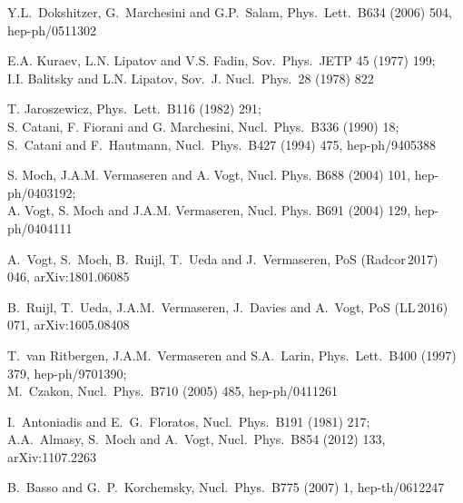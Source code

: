 \documentclass[12pt]{article}
\begin{document}
{\begin{thebibliography}{100}
Y.L.~Dokshitzer, G.~Marchesini and G.P.~Salam,
  Phys.\ Lett.\ B634 (2006) 504, hep-ph/0511302

E.A. Kuraev, L.N. Lipatov and V.S. Fadin,
  Sov.\ Phys.\ JETP 45 (1977) 199; \\[0.2mm]
I.I. Balitsky and L.N. Lipatov,
  Sov.\ J. Nucl.\ Phys.\ 28 (1978) 822

T. Jaroszewicz,
  Phys.\ Lett.\ B116 (1982) 291; \\[0.2mm]
S. Catani, F. Fiorani and G. Marchesini,
  Nucl.\ Phys.\ B336 (1990) 18; \\[0.2mm]
S.~Catani and F.~Hautmann,
  Nucl.\ Phys.\ B427 (1994) 475, hep-ph/9405388

S. Moch, J.A.M. Vermaseren and A. Vogt,
  Nucl. Phys. B688 (2004) 101, hep-ph/0403192; \\[0.2mm]
A. Vogt, S. Moch and J.A.M. Vermaseren,
  Nucl. Phys. B691 (2004) 129, hep-ph/0404111

A.~Vogt, S.~Moch, B.~Ruijl, T.~Ueda and J.~Vermaseren,
  PoS ({\sc Radcor}$\,$2017) 046, arXiv:1801.06085 

B.~Ruijl, T.~Ueda, J.A.M.~Vermaseren, J.~Davies and A.~Vogt,
  PoS (LL$\,$2016) 071, arXiv:1605.08408

T.~van Ritbergen, J.A.M.~Vermaseren and S.A.~Larin,
  Phys.\ Lett.\ B400 (1997) 379, hep-ph/9701390; \\[0.2mm]
M.~Czakon, 
  Nucl.\ Phys.\ B710 (2005) 485, hep-ph/0411261

I.~Antoniadis and E.~G.~Floratos,
  Nucl.\ Phys.\ B191 (1981) 217; \\[0.2mm]
A.A.~Almasy, S.~Moch and A.~Vogt,
  Nucl.\ Phys.\ B854 (2012) 133, arXiv:1107.2263

B.~Basso and G.~P.~Korchemsky,
  Nucl.\ Phys.\ B775 (2007) 1, hep-th/0612247


\end{thebibliography}}
\end{document}
